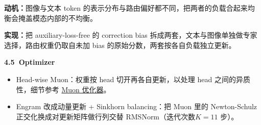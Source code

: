 \documentclass[zihao=false,fontset=windows]{ctexart}
\begin{document}
\textcolor{feishuRed}{\textbf{动机：}}图像与文本 token 的表示分布与路由偏好都不同，把两者的负载合起来均衡会掩盖模态内部的不均衡。\par

\textcolor{feishuRed}{\textbf{实现：}}把 auxiliary-loss-free 的 correction bias 拆成两套，文本与图像单独做专家选择，路由权重仍取自未加 bias 的原始分数，两套按各自负载独立更新。\par


\par{}\vspace{0.8em}\noindent \begin{tcolorbox}[boxrule=0pt,arc=3pt,colback=callOrange,left=3pt,right=3pt,top=2pt,bottom=2pt,before skip=0pt,after skip=0pt]{\bfseries \textcolor{feishuBlue}{4.5}\ Optimizer}\end{tcolorbox}\par\vspace{0.28em}
\begin{itemize}
\item 
Head-wise Muon：权重按 head 切开再各自更新，以处理 head 之间的异质性，细节参考 \href{https://scnajei2ds6y.feishu.cn/wiki/Hcj2wGTJEiohTikkdEKc7H4Nnlb}{Muon 优化器}。\par
\item 
Engram 改成动量更新 + Sinkhorn balancing：把 Muon 里的 Newton-Schulz 正交化换成对更新矩阵做行列交替 RMSNorm（迭代次数$K=11$ 步）。\par
\end{itemize}


\end{document}
